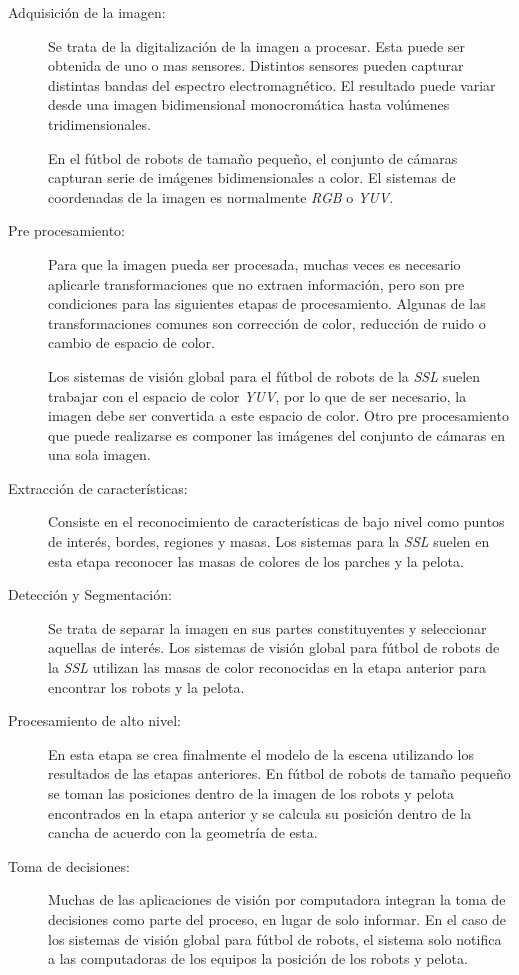 \begin{description}

	\item[Adquisición de la imagen:] Se trata de la digitalización de la
		imagen a procesar. Esta puede ser obtenida de uno o mas
		sensores. Distintos sensores pueden capturar distintas bandas
		del espectro electromagnético. El resultado puede variar desde
		una imagen bidimensional monocromática hasta volúmenes
		tridimensionales.
	
		En el fútbol de robots de tamaño pequeño, el conjunto de cámaras
		capturan serie de imágenes bidimensionales a color. El sistemas
		de coordenadas de la imagen es normalmente \emph{RGB} o
		\emph{YUV}.

	\item[Pre procesamiento:] Para que la imagen pueda ser procesada, muchas
		veces es necesario aplicarle transformaciones que no extraen
		información, pero son pre condiciones para las siguientes etapas
		de procesamiento. Algunas de las transformaciones comunes son
		corrección de color, reducción de ruido o cambio de espacio de
		color.

		Los sistemas de visión global para el fútbol de robots de la
		\emph{SSL} suelen trabajar con el espacio de color \emph{YUV},
		por lo que de ser necesario, la imagen debe ser convertida a
		este espacio de color. Otro pre procesamiento que puede
		realizarse es componer las imágenes del conjunto de cámaras en
		una sola imagen.

	\item[Extracción de características:] Consiste en el reconocimiento de
		características de bajo nivel como puntos de interés, bordes,
		regiones y masas. Los sistemas para la \emph{SSL} suelen en esta
		etapa reconocer las masas de colores de los parches y la pelota.

	\item[Detección y Segmentación:] Se trata de separar la imagen en sus
		partes constituyentes y seleccionar aquellas de interés. Los
		sistemas de visión global para fútbol de robots de la \emph{SSL}
		utilizan las masas de color reconocidas en la etapa anterior
		para encontrar los robots y la pelota.

	\item[Procesamiento de alto nivel:] En esta etapa se crea finalmente el
		modelo de la escena utilizando los resultados de las etapas
		anteriores. En fútbol de robots de tamaño pequeño se toman las
		posiciones dentro de la imagen de los robots y pelota
		encontrados en la etapa anterior y se calcula su posición dentro
		de la cancha de acuerdo con la geometría de esta.

	\item[Toma de decisiones:] Muchas de las aplicaciones de visión por
		computadora integran la toma de decisiones como parte del
		proceso, en lugar de solo informar. En el caso de los sistemas
		de visión global para fútbol de robots, el sistema solo notifica
		a las computadoras de los equipos la posición de los robots y
		pelota.

\end{description}
